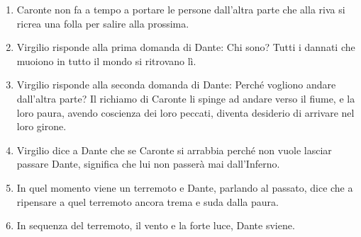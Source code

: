 \documentclass{article}
\begin{document}
\begin{enumerate}
{    similmente il mal seme d'Adamo \\ 
    gittansi di quel lito ad una ad una, \\ 
    per cenni come augel per suo richiamo.
    }
    Come un ramo in autunno vede cadere tutte le sue foglie, i dannati salgono sulla nave, lasciando spoglia la riva del fiume.
    \item 
    Caronte non fa a tempo a portare le persone dall'altra parte che alla riva si ricrea una folla per salire alla prossima.
    \item 
    Virgilio risponde alla prima domanda di Dante: Chi sono? Tutti i dannati che muoiono in tutto il mondo si ritrovano lì.
    \item Virgilio risponde alla seconda domanda di Dante: Perché vogliono andare dall'altra parte?
    Il richiamo di Caronte li spinge ad andare verso il fiume, e la loro paura, avendo coscienza dei loro peccati, diventa desiderio di arrivare nel loro girone.
    \item 
    Virgilio dice a Dante che se Caronte si arrabbia perché non vuole lasciar passare Dante, significa che lui non passerà mai dall'Inferno.
    \item 
    In quel momento viene un terremoto e Dante, parlando al passato, dice che a ripensare a quel terremoto ancora trema e suda dalla paura.
    \item 
    In sequenza del terremoto, il vento e la forte luce, Dante sviene.
\end{enumerate}
\end{document}
